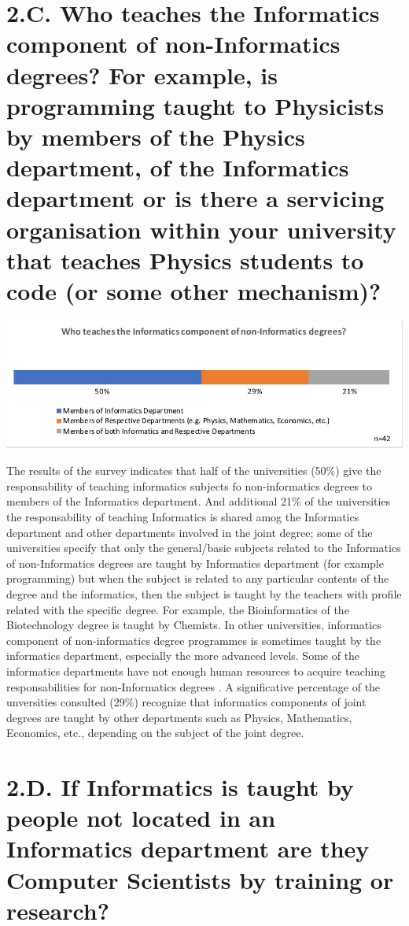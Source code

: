 \section{2.C. Who teaches the Informatics component of non-Informatics degrees? For example, is programming taught to Physicists by members of the Physics department, of the Informatics department or is there a servicing organisation within your university that teaches Physics students to code (or some other mechanism)? }

\includegraphics[width = \linewidth]{charts/2c.jpg}

The results of the survey indicates that half of the universities (50\%) give the responsability of teaching informatics subjects fo non-informatics degrees to members of the Informatics department. And additional 21\% of the universities the responsability of teaching Informatics is shared amog the Informatics department and other departments involved in the joint degree; some of the universities specify that only the general/basic subjects related to the Informatics of non-Informatics degrees are taught by Informatics department (for example programming) but when the subject is related to any particular contents of the degree and the informatics, then the subject is taught by the teachers with profile related with the specific degree. For example, the Bioinformatics of the Biotechnology degree is taught by Chemists. In other universities, informatics component of non-informatics degree programmes is sometimes taught by the informatics department, especially the more advanced levels. Some of the informatics departments have not enough human resources to acquire teaching responsabilities  for non-Informatics degrees . A significative percentage of the unversities consulted (29\%) recognize that informatics components of joint degrees are taught by other departments such as Physics, Mathematics, Economics, etc., depending on the subject of the joint degree.

\section{2.D. If Informatics is taught by people not located in an Informatics department are they Computer Scientists by training or research?}

